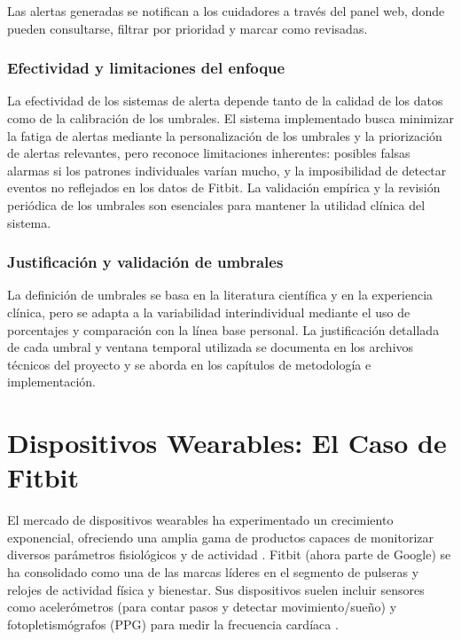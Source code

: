 Las alertas generadas se notifican a los cuidadores a través del panel web, donde pueden consultarse, filtrar por prioridad y marcar como revisadas.

\subsubsection{Efectividad y limitaciones del enfoque}
La efectividad de los sistemas de alerta depende tanto de la calidad de los datos como de la calibración de los umbrales. El sistema implementado busca minimizar la fatiga de alertas mediante la personalización de los umbrales y la priorización de alertas relevantes, pero reconoce limitaciones inherentes: posibles falsas alarmas si los patrones individuales varían mucho, y la imposibilidad de detectar eventos no reflejados en los datos de Fitbit. La validación empírica y la revisión periódica de los umbrales son esenciales para mantener la utilidad clínica del sistema.

\subsubsection{Justificación y validación de umbrales}
La definición de umbrales se basa en la literatura científica y en la experiencia clínica, pero se adapta a la variabilidad interindividual mediante el uso de porcentajes y comparación con la línea base personal. La justificación detallada de cada umbral y ventana temporal utilizada se documenta en los archivos técnicos del proyecto y se aborda en los capítulos de metodología e implementación.

\section{Dispositivos Wearables: El Caso de Fitbit}
\label{sec:ea_fitbit}

El mercado de dispositivos wearables ha experimentado un crecimiento exponencial, ofreciendo una amplia gama de productos capaces de monitorizar diversos parámetros fisiológicos y de actividad \cite{fortune_wearable_market}. Fitbit\textsuperscript{\textregistered} (ahora parte de Google) se ha consolidado como una de las marcas líderes en el segmento de pulseras y relojes de actividad física y bienestar. Sus dispositivos suelen incluir sensores como acelerómetros (para contar pasos y detectar movimiento/sueño) y fotopletismógrafos (PPG) para medir la frecuencia cardíaca \cite{fitbit_how_hr_works}.

